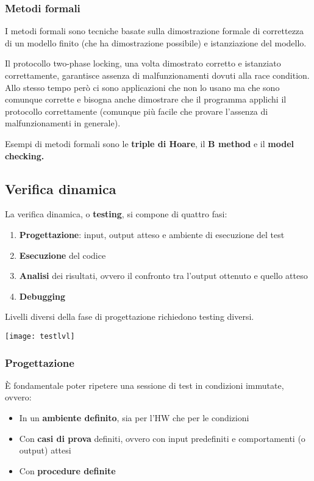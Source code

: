 \subsubsection{Metodi formali}
I metodi formali sono tecniche basate sulla dimostrazione formale di correttezza di un modello finito (che ha dimostrazione possibile) e istanziazione del modello.
\begin{example}
	Il protocollo two-phase locking, una volta dimostrato corretto e istanziato correttamente, garantisce assenza di malfunzionamenti dovuti alla race condition. Allo stesso tempo però ci sono applicazioni che non lo usano ma che sono comunque corrette e bisogna anche dimostrare che il programma applichi il protocollo correttamente (comunque più facile che provare l'assenza di malfunzionamenti in generale).
\end{example}
Esempi di metodi formali sono le \textbf{triple di Hoare}, il \textbf{B method} e il \textbf{model checking.}
\begin{figure}[!h]
	\hfill
	\hfill
\end{figure}

\subsection{Verifica dinamica}
La verifica dinamica, o \textbf{testing}, si compone di quattro fasi:
\begin{enumerate}
	\item \textbf{Progettazione}: input, output atteso e ambiente di esecuzione del test
	\item \textbf{Esecuzione} del codice
	\item \textbf{Analisi} dei risultati, ovvero il confronto tra l'output ottenuto e quello atteso
	\item \textbf{Debugging}
\end{enumerate}
Livelli diversi della fase di progettazione richiedono testing diversi.
\begin{center}
	\texttt{[image: testlvl]}
\end{center}

\subsubsection{Progettazione}
È fondamentale poter ripetere una sessione di test in condizioni immutate, ovvero:
\begin{itemize}
	\item In un \textbf{ambiente definito}, sia per l'HW che per le condizioni
	\item Con \textbf{casi di prova} definiti, ovvero con input predefiniti e comportamenti (o output) attesi
	\item Con \textbf{procedure definite}
\end{itemize}

